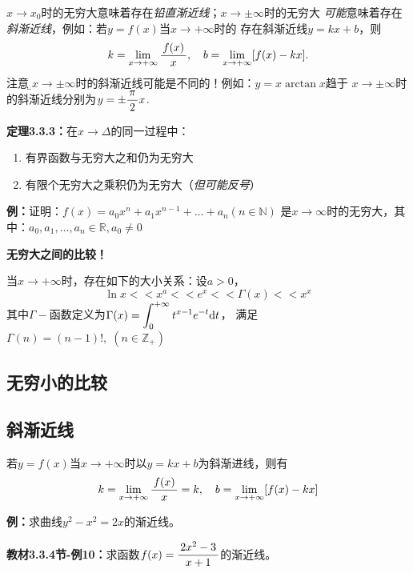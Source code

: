 $x\to x_0$时的无穷大意味着存在{\it 铅直渐近线}；$x\to\pm\infty$时的无穷大
{\it 可能}意味着存在{\it 斜渐近线}，例如：若$y=f(x)$当$x\to+\infty$时的
存在斜渐近线$y=kx+b$，则
$$k=\lim\limits_{x\to{+\infty}}\displaystyle\frac{\,{f(x)}\,}{\,{x}\,},\quad b=\lim\limits_{x\to{+\infty}}[f(x)-kx].$$
注意，{\b $x\to\pm\infty$时的斜渐近线可能是不同的！}例如：$y=x\arctan x$趋于
$x\to\pm\infty$时的斜渐近线分别为$y=\pm\displaystyle\frac{\,{\pi}\,}{\,{2}\,}x$.


{\bf 定理3.3.3：}在$x\to\Delta$的同一过程中：
\begin{enumerate}[(1)]
  \setlength{\itemindent}{1cm}
  \item 有界函数与无穷大之和仍为无穷大
  \item 有限个无穷大之乘积仍为无穷大（{\it 但可能反号}）
\end{enumerate}

{\bf 例：}证明：$f(x)=a_0x^n+a_1x^{n-1}+\ldots+a_n(n\in\mathbb{N})$
是$x\to\infty$时的无穷大，其中：$a_0,a_1,\ldots,a_n\in\mathbb{R},a_0\ne 0$

\begin{shaded}
	{\bf 无穷大之间的比较！}
	
	当$x\to+\infty$时，存在如下的大小关系：设$a>0$，
	$$\ln x<<x^a<<e^x<<\Gamma(x)<<x^x$$
	其中$\Gamma-$函数定义为$\Gamma(x)=\displaystyle\int_0^{+\infty}t^{x-1}e^{-t}\mathrm{d} t$，
	满足$\Gamma(n)=(n-1)!,\;(n\in\mathbb{Z}_+)$
\end{shaded}

\subsection{无穷小的比较}



\subsection{斜渐近线}

若$y=f(x)$当$x\to+\infty$时以$y=kx+b$为斜渐进线，则有
$$k=\lim\limits_{x\to{+\infty}}\displaystyle\frac{\,{f(x)}\,}{\,{x}\,}=k,\quad b=\lim\limits_{x\to{+\infty}}[f(x)-kx]$$

{\bf 例：}求曲线$y^2-x^2=2x$的渐近线。

{\bf 教材3.3.4节-例10：}求函数$f(x)=\displaystyle\frac{\,{2x^2-3}\,}{\,{x+1}\,}$的渐近线。

\begin{center}
\end{center}

